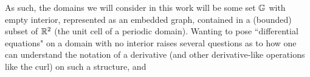 As such, the domains we will consider in this work will be some set $\mathbb{G}$ with empty interior, represented as an embedded graph, contained in a (bounded) subset of $\mathbb{R}^2$ (the unit cell of a periodic domain).
Wanting to pose ``differential equations" on a domain with no interior raises several questions as to how one can understand the notation of a derivative (and other derivative-like operations like the curl) on such a structure, and 